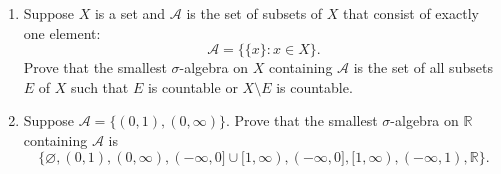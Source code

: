\documentclass[11pt, a4paper, tikz]{article}
\newcommand{\reals}{
	\ensuremath{\mathbb{R}}
}
\begin{document}
	\begin{formulationBox}
		\begin{enumerate}[label=\alph*)]
			\item Suppose $X$ is a set and $\mathcal{A}$ is the set of subsets of $X$ that consist of exactly one element: \[\mathcal{A} = \{\{x\}:x\in X\}.\]
			Prove that the smallest $\sigma$-algebra on $X$ containing $\mathcal{A}$ is the set of all subsets $E$ of $X$ such that $E$ is countable or $X\setminus E$ is countable.
			
			\item Suppose $\mathcal{A} = \{(0,1), (0,\infty)\}$. Prove that the smallest $\sigma$-algebra on $\reals$ containing $\mathcal{A}$ is \[\{\varnothing, (0,1), (0,\infty), (-\infty,0]\cup[1,\infty), (-\infty, 0], [1,\infty), (-\infty,1), \reals\}.\]
		\end{enumerate}
	\end{formulationBox}
\end{document}
